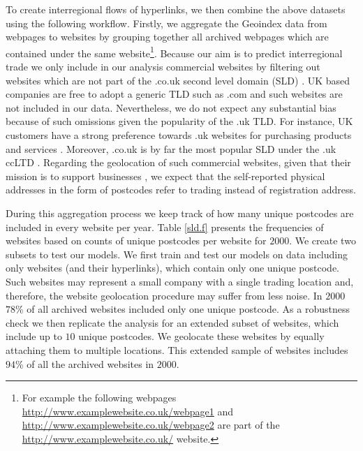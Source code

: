 \documentclass[]{interact}
\theoremstyle{plain}%
\theoremstyle{definition}
\theoremstyle{remark}
\begin{document}
To create interregional flows of hyperlinks, we then combine the above
datasets using the following workflow. Firstly, we aggregate the
Geoindex data from webpages to websites by grouping together all
archived webpages which are contained under the same website\footnote{For
  example the following webpages
  \url{http://www.examplewebsite.co.uk/webpage1} and
  \url{http://www.examplewebsite.co.uk/webpage2} are part of the
  \url{http://www.examplewebsite.co.uk/} website.}. Because our aim is
to predict interregional trade we only include in our analysis
commercial websites by filtering out websites which are not part of the
.co.uk second level domain (SLD) \citep{THELWALL2000441}. UK based
companies are free to adopt a generic TLD such as .com and such websites
are not included in our data. Nevertheless, we do not expect any
substantial bias because of such omissions given the popularity of the
.uk TLD. For instance, UK customers have a strong preference towards .uk
websites for purchasing products and services \citep{hope}. Moreover,
.co.uk is by far the most popular SLD under the .uk ccLTD
\citep{tranos2020digital}. Regarding the geolocation of such commercial
websites, given that their mission is to support businesses
\citep{blazquez2018big}, we expect that the self-reported physical
addresses in the form of postcodes refer to trading instead of
registration address.

During this aggregation process we keep track of how many unique
postcodes are included in every website per year. Table \ref{sld.f}
presents the frequencies of websites based on counts of unique postcodes
per website for \(2000\). We create two subsets to test our models. We
first train and test our models on data including only websites (and
their hyperlinks), which contain only one unique postcode. Such websites
may represent a small company with a single trading location and,
therefore, the website geolocation procedure may suffer from less noise.
In \(2000\) \(78\)\% of all archived websites included only one unique
postcode. As a robustness check we then replicate the analysis for an
extended subset of websites, which include up to \(10\) unique
postcodes. We geolocate these websites by equally attaching them to
multiple locations. This extended sample of websites includes \(94\)\%
of all the archived websites in \(2000\).
\end{document}
